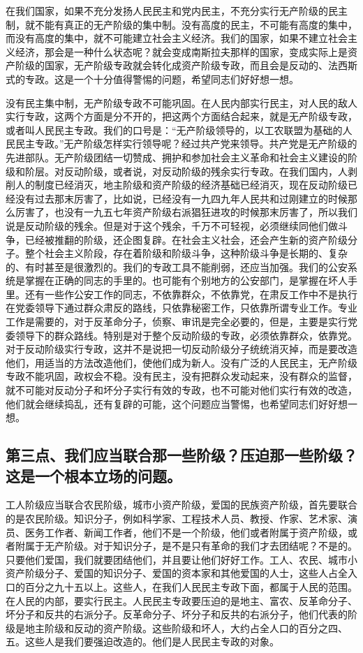 在我们国家，如果不充分发扬人民民主和党内民主，不充分实行无产阶级的民主制，就不能有真正的无产阶级的集中制。没有高度的民主，不可能有高度的集中，而没有高度的集中，就不可能建立社会主义经济。我们的国家，如果不建立社会主义经济，那会是一种什么状态呢？就会变成南斯拉夫那样的国家，变成实际上是资产阶级的国家，无产阶级专政就会转化成资产阶级专政，而且会是反动的、法西斯式的专政。这是一个十分值得警惕的问题，希望同志们好好想一想。

没有民主集中制，无产阶级专政不可能巩固。在人民内部实行民主，对人民的敌人实行专政，这两个方面是分不开的，把这两个方面结合起来，就是无产阶级专政，或者叫人民民主专政。我们的口号是：“无产阶级领导的，以工农联盟为基础的人民民主专政。”无产阶级怎样实行领导呢？经过共产党来领导。共产党是无产阶级的先进部队。无产阶级团结一切赞成、拥护和参加社会主义革命和社会主义建设的阶级和阶层。对反动阶级，或者说，对反动阶级的残余实行专政。在我们国内，人剥削人的制度已经消灭，地主阶级和资产阶级的经济基础已经消灭，现在反动阶级已经没有过去那末厉害了，比如说，已经没有一九四九年人民共和过刚建立的时候那么厉害了，也没有一九五七年资产阶级右派猖狂进攻的时候那末厉害了，所以我们说是反动阶级的残余。但是对于这个残余，千万不可轻视，必须继续同他们做斗争，已经被推翻的阶级，还企图复辟。在社会主义社会，还会产生新的资产阶级分子。整个社会主义阶段，存在着阶级和阶级斗争，这种阶级斗争是长期的、复杂的、有时甚至是很激烈的。我们的专政工具不能削弱，还应当加强。我们的公安系统是掌握在正确的同志的手里的。也可能有个别地方的公安部门，是掌握在坏人手里。还有一些作公安工作的同志，不依靠群众，不依靠党，在肃反工作中不是执行在党委领导下通过群众肃反的路线，只依靠秘密工作，只依靠所谓专业工作。专业工作是需要的，对于反革命分子，侦察、审讯是完全必要的，但是，主要是实行党委领导下的群众路线。特别是对于整个反动阶级的专政，必须依靠群众，依靠党。对于反动阶级实行专政，这并不是说把一切反动阶级分子统统消灭掉，而是要改造他们，用适当的方法改造他们，使他们成为新人。没有广泛的人民民主，无产阶级专政不能巩固，政权会不稳。没有民主，没有把群众发动起来，没有群众的监督，就不可能对反动分子和坏分子实行有效的专政，也不可能对他们实行有效的改造，他们就会继续捣乱，还有复辟的可能，这个问题应当警惕，也希望同志们好好想一想。

\subsection{第三点、我们应当联合那一些阶级？压迫那一些阶级？这是一个根本立场的问题。}

工人阶级应当联合农民阶级，城市小资产阶级，爱国的民族资产阶级，首先要联合的是农民阶级。知识分子，例如科学家、工程技术人员、教授、作家、艺术家、演员、医务工作者、新闻工作者，他们不是一个阶级，他们或者附属于资产阶级，或者附属于无产阶级。对于知识分子，是不是只有革命的我们才去团结呢？不是的。只要他们爱国，我们就要团结他们，并且要让他们好好工作。工人、农民、城市小资产阶级分子、爱国的知识分子、爱国的资本家和其他爱国的人士，这些人占全入口的百分之九十五以上。这些人，在我们人民民主专政下面，都属于人民的范围。在人民的内部，要实行民主。人民民主专政要压迫的是地主、富农、反革命分子、坏分子和反共的右派分子。反革命分子、坏分子和反共的右派分子，他们代表的阶级是地主阶级和反动的资产阶级。这些阶级和坏人，大约占全人口的百分之四、五。这些人是我们要强迫改造的。他们是人民民主专政的对象。

